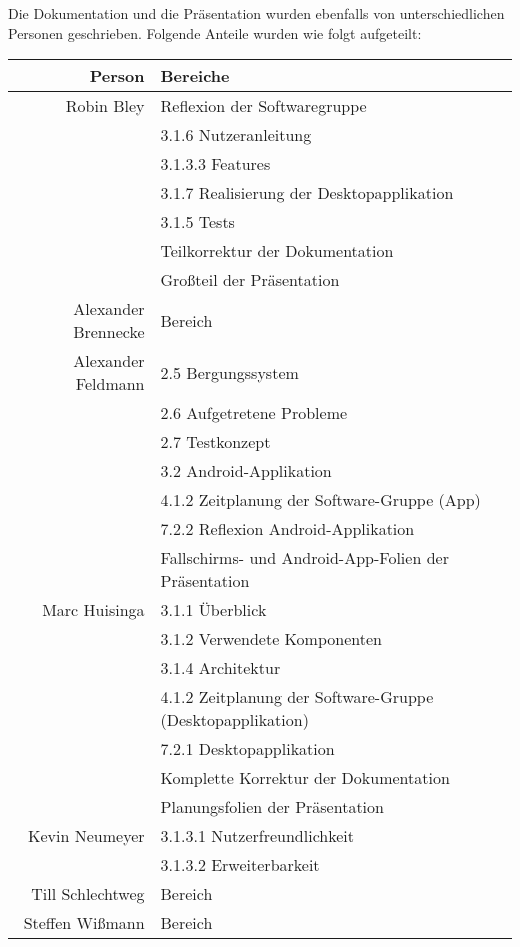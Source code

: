 Die Dokumentation und die Präsentation wurden ebenfalls von unterschiedlichen Personen geschrieben. Folgende Anteile wurden wie folgt aufgeteilt:

\begin{table}[H]
	\centering
	\begin{tabular}{rl}
		\toprule
		\textbf{Person} & \textbf{Bereiche} \\
		\midrule
		Robin Bley & Reflexion der Softwaregruppe \\
		 & 3.1.6 Nutzeranleitung \\
		 & 3.1.3.3 Features \\
		 & 3.1.7 Realisierung der Desktopapplikation \\
		 & 3.1.5 Tests \\
		 & Teilkorrektur der Dokumentation \\
		 & Großteil der Präsentation \\
		Alexander Brennecke & Bereich \\
		Alexander Feldmann & 2.5 Bergungssystem \\
		 & 2.6 Aufgetretene Probleme \\
		 & 2.7 Testkonzept \\
		 & 3.2 Android-Applikation \\
		 & 4.1.2 Zeitplanung der Software-Gruppe (App) \\
		 & 7.2.2 Reflexion Android-Applikation \\
		 & Fallschirms- und Android-App-Folien der Präsentation \\
		Marc Huisinga & 3.1.1 Überblick \\
		 & 3.1.2 Verwendete Komponenten \\
		 & 3.1.4 Architektur \\
		 & 4.1.2 Zeitplanung der Software-Gruppe (Desktopapplikation) \\
		 & 7.2.1 Desktopapplikation \\
		 & Komplette Korrektur der Dokumentation \\
		 & Planungsfolien der Präsentation \\
		Kevin Neumeyer & 3.1.3.1 Nutzerfreundlichkeit \\
		 & 3.1.3.2 Erweiterbarkeit \\
		Till Schlechtweg & Bereich \\
		Steffen Wißmann & Bereich \\
		\bottomrule
	\end{tabular}
\end{table}

